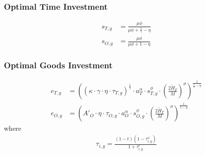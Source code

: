 \documentclass[11pt]{beamer}
\begin{document}
\begin{frame}
	\frametitle{Optimal Time Investment} 
	\label{time_inv}
	\begin{align}
		s_{T,g} & = \frac{\mu \phi}{\mu \phi+\tfrac{1}{\gamma}-\eta} \nonumber\\
		s_{O,g} & = \frac{\mu \phi}{\mu \phi+1-\eta} \nonumber
	\end{align}
	\hyperlink{eqm}{}
\end{frame}

\begin{frame}
	\frametitle{Optimal Goods Investment} 
	\label{good_inv}
	\begin{align}
		e_{T,g} & = \left( \left(\kappa \cdot \gamma \cdot \eta \cdot \tau_{T,g} \right)^\frac{1}{\gamma} \cdot a_T^{\alpha} \cdot s_{T,g}^{\phi} \cdot \left(\tfrac{2\widetilde{H}_T}{M}\right)^{\sigma}\right)^{\frac{1}{\frac{1}{\gamma}-\eta}}  \nonumber\\
		e_{O,g} & = \left( {{A'}_{O}} \cdot \eta \cdot\tau_{O,g} \cdot a_O^\alpha \cdot s_{O,g}^\phi \cdot  \left(\tfrac{2\widetilde{H}_T}{M}\right)^\sigma \right)^{\frac{1}{1-\eta}} \nonumber
	\end{align}
	where
	\begin{align}
		\tau_{i,g} =\frac{(1-t)(1-\tau^{\omega}_{i,g})}{1+\tau^e_{i,g}} \nonumber
	\end{align}
	\hyperlink{eqm}{}
\end{frame}
\end{document}
